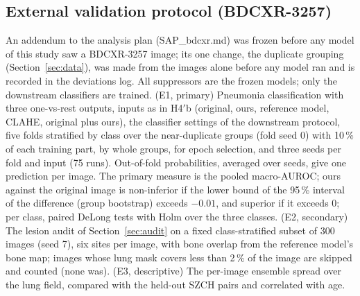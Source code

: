 \subsection{External validation protocol (BDCXR-3257)}
\label{sec:bdcxr_protocol}
An addendum to the analysis plan (SAP\_bdcxr.md) was frozen before any model of this study saw a BDCXR-3257 image; its one change, the
duplicate grouping (Section~\ref{sec:data}), was made from the images alone before any model ran and is recorded in the deviations log. All
suppressors are the frozen models; only the downstream classifiers are trained. (E1, primary) Pneumonia classification with three one-vs-rest
outputs, inputs as in H4$'$b (original, ours, reference model, CLAHE, original plus ours), the classifier settings of the downstream protocol,
five folds stratified by class over the near-duplicate groups (fold seed 0) with 10\,\% of each training part, by whole groups, for epoch selection,
and three seeds per fold and input (75 runs). Out-of-fold probabilities, averaged over seeds, give one prediction per image. The primary measure
is the pooled macro-AUROC; ours against the original image is non-inferior if the lower bound of the 95\,\% interval of the difference (group
bootstrap) exceeds $-0.01$, and superior if it exceeds 0; per class, paired DeLong tests with Holm over the three classes. (E2, secondary) The
lesion audit of Section~\ref{sec:audit} on a fixed class-stratified subset of 300 images (seed 7), six sites per image, with bone overlap from the
reference model's bone map; images whose lung mask covers less than 2\,\% of the image are skipped and counted (none was). (E3, descriptive) The
per-image ensemble spread over the lung field, compared with the held-out SZCH pairs and correlated with age.
